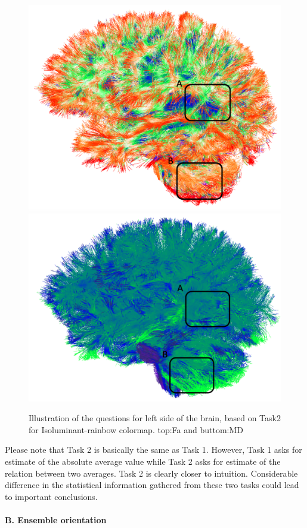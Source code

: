 \documentclass[hyperref, plainreport, noproblem]{cgvpub1}
\begin{document}
\begin{itemize}
\begin{figure}[t]
	\centering
	\includegraphics[width=0.8\columnwidth]{isorainbow-fa-task2}
	\includegraphics[width=0.8\columnwidth]{isorainbow-md-task2}
	\caption{Illustration of the questions for left side of the brain, based on Task2 for Isoluminant-rainbow colormap. top:Fa and buttom:MD}
	\label{fig:task2}
\end{figure}

	
	
Please note that Task 2 is basically the same as Task 1. However, Task 1 asks for estimate of the absolute average value  while Task 2 asks for estimate of the relation between two averages. Task 2 is clearly closer to intuition. Considerable difference in the statistical information gathered from these two tasks could lead to important conclusions.
	
\end{itemize}


\paragraph{B. Ensemble orientation}
\end{document}
